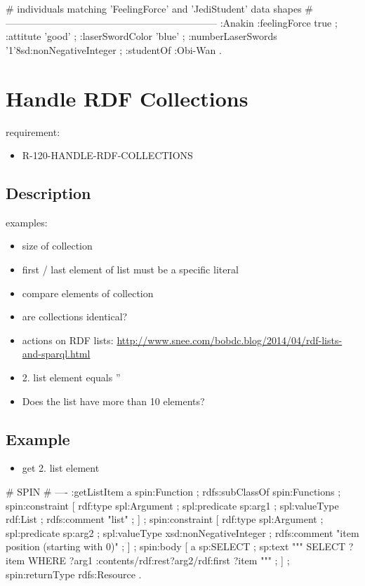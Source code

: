 \documentclass{llncs}
\begin{document}
\begin{ex}
# individuals matching 'FeelingForce' and 'JediStudent' data shapes
# -----------------------------------------------------------------
:Anakin 
    :feelingForce true ;
    :attitute 'good' ;
    :laserSwordColor 'blue' ;
    :numberLaserSwords '1'^^xsd:nonNegativeInteger ;
    :studentOf :Obi-Wan .
\end{ex}

\section{Handle RDF Collections}

requirement:

\begin{itemize}
	\item R-120-HANDLE-RDF-COLLECTIONS
\end{itemize}

\subsection{Description}

examples:

\begin{itemize}
	\item size of collection
	\item first / last element of list must be a specific literal
	\item compare elements of collection
	\item are collections identical?
	\item actions on RDF lists: \url{http://www.snee.com/bobdc.blog/2014/04/rdf-lists-and-sparql.html}
	\item 2. list element equals ''
	\item Does the list have more than 10 elements?
\end{itemize}

\subsection{Example}

\begin{itemize}
	\item get 2. list element
\end{itemize}

\begin{ex}
# SPIN
# ----
:getListItem
    a spin:Function ; rdfs:subClassOf spin:Functions ;
    spin:constraint [
        rdf:type spl:Argument ;
        spl:predicate sp:arg1 ;
        spl:valueType rdf:List ;
        rdfs:comment "list" ; ] ;
    spin:constraint [
        rdf:type spl:Argument ;
        spl:predicate sp:arg2 ;
        spl:valueType xsd:nonNegativeInteger ;
        rdfs:comment "item position (starting with 0)" ; ] ;
    spin:body [
        a sp:SELECT ;
        sp:text """
            SELECT ?item
            WHERE {
                ?arg1 :contents/rdf:rest{?arg2}/rdf:first ?item } """ ; ] ;
    spin:returnType rdfs:Resource .
\end{ex}
\end{document}
